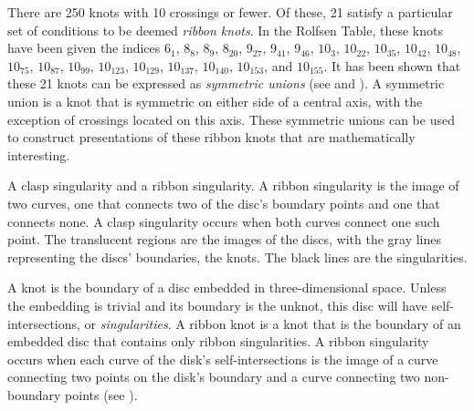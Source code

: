 \begin{paper}

There are 250 knots with 10 crossings or fewer.
Of these, 21 satisfy a particular set of conditions to be deemed \textit{ribbon
knots}.
In the Rolfsen Table, these knots have been given the indices $6_1$, $8_8$,
$8_9$, $8_{20}$, $9_{27}$, $9_{41}$, $9_{46}$, $10_3$, $10_{22}$, $10_{35}$,
$10_{42}$, $10_{48}$, $10_{75}$, $10_{87}$, $10_{99}$, $10_{123}$, $10_{129}$,
$10_{137}$, $10_{140}$, $10_{153}$, and $10_{155}$.
It has been shown that these 21 knots can be expressed as \textit{symmetric
unions} (see \cite{many} and \cite{one}).
A symmetric union is a knot that is symmetric on either side of a central axis,
with the exception of crossings located on this axis.
These symmetric unions can be used to construct presentations of these ribbon
knots that are mathematically interesting.

{A clasp singularity and a ribbon singularity.
A ribbon singularity is the image of two curves, one that connects two of the
disc's boundary points and one that connects none.
A clasp singularity occurs when both curves connect one such point.
The translucent regions are the images of the discs, with the gray lines
representing the discs' boundaries, the knots.
The black lines are the singularities.}

A knot is the boundary of a disc embedded in three-dimensional space.
Unless the embedding is trivial and its boundary is the unknot, this disc will
have self-intersections, or \textit{singularities}.
A ribbon knot is a knot that is the boundary of an embedded disc that contains
only ribbon singularities.
A ribbon singularity occurs when each curve of the disk's self-intersections is
the image of a curve connecting two points on the disk's boundary and a curve
connecting two non-boundary points (see \figSingularities).



\end{paper}
